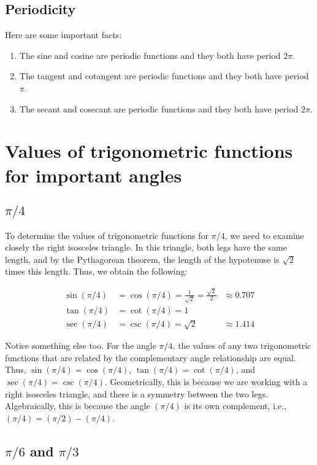 \documentclass{amsart}
\begin{document}
\subsection{Periodicity}

Here are some important facts:

\begin{enumerate}
\item The sine and cosine are periodic functions and they both have
  period $2\pi$.
\item The tangent and cotangent are periodic functions and they both
  have period $\pi$.
\item The secant and cosecant are periodic functions and they both
  have period $2\pi$.
\end{enumerate}
\section{Values of trigonometric functions for important angles}

\subsection{$\pi/4$}

To determine the values of trigonometric functions for $\pi/4$,
we need to examine closely the right isosceles triangle. In this
triangle, both legs have the same length, and by the Pythagorean
theorem, the length of the hypotenuse is $\sqrt{2}$ times this
length. Thus, we obtain the following:

\begin{align*}
  \sin (\pi/4) & = \cos (\pi/4)  = \frac{1}{\sqrt{2}} = \frac{\sqrt{2}}{2} & \approx 0.707\\
  \tan (\pi/4) & = \cot (\pi/4) = 1 \\
  \sec (\pi/4) & = \csc (\pi/4) = \sqrt{2} & \approx 1.414
\end{align*}

Notice something else too. For the angle $\pi/4$, the values of
any two trigonometric functions that are related by the complementary
angle relationship are equal. Thus, $\sin (\pi/4) = \cos
(\pi/4)$, $\tan (\pi/4) = \cot (\pi/4)$, and $\sec (\pi/4)
= \csc (\pi/4)$. Geometrically, this is because we are working with
a right isosceles triangle, and there is a symmetry between the two
legs. Algebraically, this is because the angle $(\pi/4)$ is its own
complement, i.e., $(\pi/4) = (\pi/2) - (\pi/4)$.

\subsection{$\pi/6$ and $\pi/3$}
\end{document}
